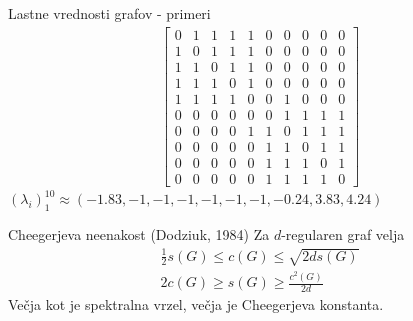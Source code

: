 \documentclass{beamer}
\begin{document}
\begin{frame}{Lastne vrednosti grafov - primeri}
    \begin{align*}
        \begin{bmatrix}
            0 & 1 & 1 & 1 & 1 & 0 & 0 & 0 & 0 & 0 \\
            1 & 0 & 1 & 1 & 1 & 0 & 0 & 0 & 0 & 0 \\
            1 & 1 & 0 & 1 & 1 & 0 & 0 & 0 & 0 & 0 \\
            1 & 1 & 1 & 0 & 1 & 0 & 0 & 0 & 0 & 0 \\
            1 & 1 & 1 & 1 & 0 & 0 & 1 & 0 & 0 & 0 \\
            0 & 0 & 0 & 0 & 0 & 0 & 1 & 1 & 1 & 1 \\
            0 & 0 & 0 & 0 & 1 & 1 & 0 & 1 & 1 & 1 \\
            0 & 0 & 0 & 0 & 0 & 1 & 1 & 0 & 1 & 1 \\
            0 & 0 & 0 & 0 & 0 & 1 & 1 & 1 & 0 & 1 \\
            0 & 0 & 0 & 0 & 0 & 1 & 1 & 1 & 1 & 0
        \end{bmatrix}
    \end{align*}
    \((\lambda_i)_1^{10} \approx (-1.83, -1, -1, -1, -1, -1, -1, -0.24, 3.83, 4.24)\)
\end{frame}
\begin{frame}{Cheegerjeva neenakost (Dodziuk, 1984)}
    Za \(d\)-regularen graf velja
    \begin{align*}
        \frac{1}{2}s(G)\leq c(G) \leq \sqrt{2d s(G)} \\
        2c(G) \geq s(G) \geq \frac{c^2(G)}{2d}
    \end{align*}
    Večja kot je spektralna vrzel, večja je Cheegerjeva konstanta.
\end{frame}
\end{document}
